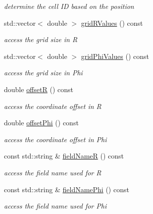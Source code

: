 \begin{DoxyCompactItemize}
\begin{DoxyCompactList}\small\item\em determine the cell ID based on the position \end{DoxyCompactList}\item 
std\+::vector$<$ double $>$ \hyperlink{class_d_d4hep_1_1_d_d_segmentation_1_1_polar_grid_r_phi2_a27be038b7d2501211c3a814016875daf}{grid\+R\+Values} () const
\begin{DoxyCompactList}\small\item\em access the grid size in R \end{DoxyCompactList}\item 
std\+::vector$<$ double $>$ \hyperlink{class_d_d4hep_1_1_d_d_segmentation_1_1_polar_grid_r_phi2_a946a7c5a55f8724236bdf3198929b130}{grid\+Phi\+Values} () const
\begin{DoxyCompactList}\small\item\em access the grid size in Phi \end{DoxyCompactList}\item 
double \hyperlink{class_d_d4hep_1_1_d_d_segmentation_1_1_polar_grid_r_phi2_a7b684077d95e9e6a37db23ff19239236}{offsetR} () const
\begin{DoxyCompactList}\small\item\em access the coordinate offset in R \end{DoxyCompactList}\item 
double \hyperlink{class_d_d4hep_1_1_d_d_segmentation_1_1_polar_grid_r_phi2_ae815cf507d7596b69c44561ade2121c7}{offset\+Phi} () const
\begin{DoxyCompactList}\small\item\em access the coordinate offset in Phi \end{DoxyCompactList}\item 
const std\+::string \& \hyperlink{class_d_d4hep_1_1_d_d_segmentation_1_1_polar_grid_r_phi2_a3a7168aee4b9f951dfb018cb1b75905f}{field\+NameR} () const
\begin{DoxyCompactList}\small\item\em access the field name used for R \end{DoxyCompactList}\item 
const std\+::string \& \hyperlink{class_d_d4hep_1_1_d_d_segmentation_1_1_polar_grid_r_phi2_ab8658c10a02490a6ab04ed4a7404d44b}{field\+Name\+Phi} () const
\begin{DoxyCompactList}\small\item\em access the field name used for Phi \end{DoxyCompactList}\item 

\end{DoxyCompactItemize}
